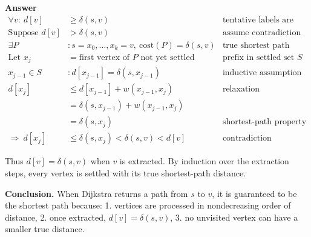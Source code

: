 \documentclass[11pt]{article}
\theoremstyle{definition}
\theoremstyle{remark}
\begin{document}
\noindent\textbf{Answer}\\
\begin{align*}
\forall v:\ d[v] &\ge \delta(s,v) &\text{tentative labels are upper bounds}\\
\text{Suppose } d[v] &> \delta(s,v) &\text{assume contradiction}\\
\exists P &: s=x_0,\ldots,x_k=v,\ \text{cost}(P)=\delta(s,v) &\text{true shortest path}\\
\text{Let }x_j &= \text{first vertex of $P$ not yet settled} &\text{prefix in settled set $S$}\\
x_{j-1}\in S &: d[x_{j-1}]=\delta(s,x_{j-1}) &\text{inductive assumption}\\
d[x_j] &\le d[x_{j-1}]+w(x_{j-1},x_j) &\text{relaxation}\\
&= \delta(s,x_{j-1})+w(x_{j-1},x_j)\\
&= \delta(s,x_j) &\text{shortest-path property}\\
\Rightarrow\ d[x_j] &\le \delta(s,x_j) < \delta(s,v) < d[v] &\text{contradiction}
\end{align*}

Thus $d[v]=\delta(s,v)$ when $v$ is extracted. By induction over the extraction steps, every vertex is settled with its true shortest-path distance.

\medskip
\noindent\textbf{Conclusion.}  
When Dijkstra returns a path from $s$ to $v$, it is guaranteed to be the shortest path because:  
1. vertices are processed in nondecreasing order of distance,  
2. once extracted, $d[v]=\delta(s,v)$,  
3. no unvisited vertex can have a smaller true distance.  
\end{document}
